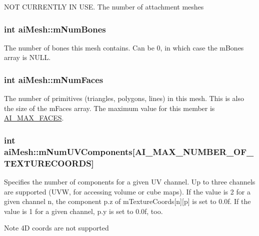 N\-O\-T C\-U\-R\-R\-E\-N\-T\-L\-Y I\-N U\-S\-E. The number of attachment meshes \hypertarget{structai_mesh_a0f9d5425b6300e32a842a94f943fd79e}{
\subsubsection[{m\-Num\-Bones}]{ {\bf int} ai\-Mesh\-::m\-Num\-Bones}}\label{structai_mesh_a0f9d5425b6300e32a842a94f943fd79e}
The number of bones this mesh contains. Can be 0, in which case the m\-Bones array is N\-U\-L\-L. \hypertarget{structai_mesh_aeed22ee6963b79548f3877b3c905518e}{
\subsubsection[{m\-Num\-Faces}]{ {\bf int} ai\-Mesh\-::m\-Num\-Faces}}\label{structai_mesh_aeed22ee6963b79548f3877b3c905518e}
The number of primitives (triangles, polygons, lines) in this mesh. This is also the size of the m\-Faces array. The maximum value for this member is \hyperlink{ai_mesh_8h_aef69217e80411f3fee5aae3dc06b68ba}{A\-I\-\_\-\-M\-A\-X\-\_\-\-F\-A\-C\-E\-S}. \hypertarget{structai_mesh_a635c631a6e66d32989d6b25b2a892d86}{
\subsubsection[{m\-Num\-U\-V\-Components}]{ {\bf int} ai\-Mesh\-::m\-Num\-U\-V\-Components\mbox{[}{\bf A\-I\-\_\-\-M\-A\-X\-\_\-\-N\-U\-M\-B\-E\-R\-\_\-\-O\-F\-\_\-\-T\-E\-X\-T\-U\-R\-E\-C\-O\-O\-R\-D\-S}\mbox{]}}}\label{structai_mesh_a635c631a6e66d32989d6b25b2a892d86}
Specifies the number of components for a given U\-V channel. Up to three channels are supported (U\-V\-W, for accessing volume or cube maps). If the value is 2 for a given channel n, the component p.\-z of m\-Texture\-Coords\mbox{[}n\mbox{]}\mbox{[}p\mbox{]} is set to 0.\-0f. If the value is 1 for a given channel, p.\-y is set to 0.\-0f, too. \begin{DoxyNote}{Note}
4\-D coords are not supported 
\end{DoxyNote}

